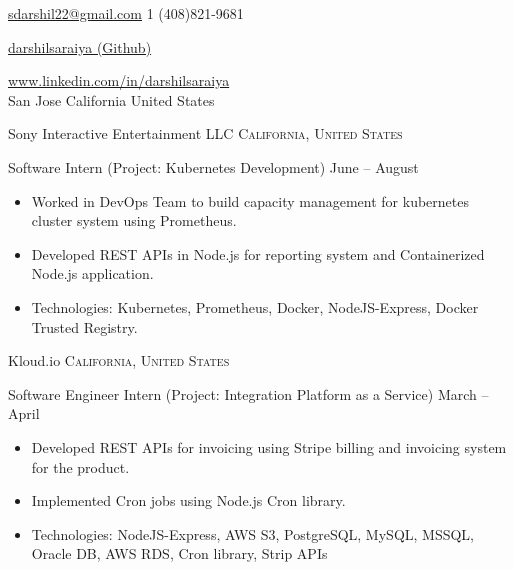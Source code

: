 \documentclass[10pt,a4paper]{article}
\begin{document}
\sloppy  %



\nobreakvspace{0.4em}  %

\noindent\href{mailto:sdarshil22.at.gmail.dot.com}{sdarshil22\mbox{}@\mbox{}gmail.com}\sbull
\textsmaller{+}1 (408)821-9681\sbull
{\newnums \href{https://github.com/darshilsaraiya}{darshilsaraiya (Github)}\sbull
{\mewmums \href{https://www.linkedin.com/in/darshilsaraiya/}{www.linkedin.com/in/darshilsaraiya}
\\
{San Jose\sbull
California\sbull
United States
}
\spacedhrule{0.0em}{-0.4em}  %

{}

\spacedhrule{0.0em}{-0.4em}



\headedsection  %
  {Sony Interactive Entertainment LLC}
  {\textsc{California, United States}} {%
  \headedsubsection
    {Software Intern (Project: Kubernetes Development)}
    {June  -- August }
    {\bodytext
    {
    \begin{itemize}
        \item Worked in DevOps Team to build capacity management for kubernetes cluster system using Prometheus. 
        \item Developed REST APIs in Node.js for reporting system and Containerized Node.js application.
        \item Technologies: Kubernetes, Prometheus, Docker, NodeJS-Express, Docker Trusted Registry.
    \end{itemize}}}
}

\headedsection  %
  {Kloud.io}
  {\textsc{California, United States}} {%
  \headedsubsection
    {Software Engineer Intern (Project: Integration Platform as a Service)}
    {March  -- April }
    {\bodytext
    {
    \begin{itemize}
        \item Developed REST APIs for invoicing using Stripe billing and invoicing system for the product.
        \item Implemented Cron jobs using Node.js Cron library.
        \item Technologies: NodeJS-Express, AWS S3, PostgreSQL, MySQL, MSSQL, Oracle DB, AWS RDS, Cron library, Strip APIs
    \end{itemize}}}
}

}}
\end{document}
